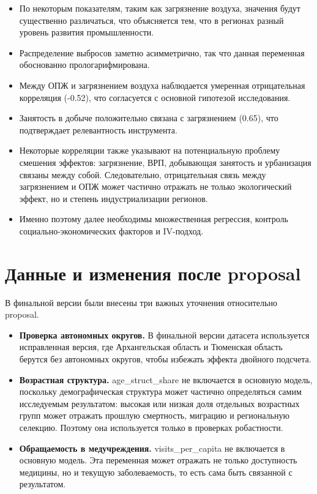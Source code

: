 \documentclass[11pt,a4paper]{article}
\begin{document}
\begin{itemize}
\item По некоторым показателям, таким как загрязнение воздуха, значения будут существенно различаться, что объясняется тем, что в регионах разный уровень развития промышленности.
\item Распределение выбросов заметно асимметрично, так что данная переменная обоснованно прологарифмирована.
\item Между ОПЖ и загрязнением воздуха наблюдается умеренная отрицательная корреляция (-0.52), что согласуется с основной гипотезой исследования.
\item Занятость в добыче положительно связана с загрязнением (0.65), что подтверждает релевантность инструмента.
\item Некоторые корреляции также указывают на потенциальную проблему смешения эффектов: загрязнение, ВРП, добывающая занятость и урбанизация связаны между собой. Следовательно, отрицательная связь между загрязнением и ОПЖ может частично отражать не только экологический эффект, но и степень индустриализации регионов.
\item Именно поэтому далее необходимы множественная регрессия, контроль социально-экономических факторов и IV-подход.
\end{itemize}
\section*{Данные и изменения после proposal}
В финальной версии были внесены три важных уточнения относительно proposal.

\begin{itemize}
\item \textbf{Проверка автономных округов.} В финальной версии датасета используется исправленная версия, где Архангельская область и Тюменская область берутся без автономных округов, чтобы избежать эффекта двойного подсчета.
\item \textbf{Возрастная структура.} age\_struct\_share не включается в основную модель, поскольку демографическая структура может частично определяться самим исследуемым результатом: высокая или низкая доля отдельных возрастных групп может отражать прошлую смертность, миграцию и региональную селекцию. Поэтому она используется только в проверках робастности.
\item \textbf{Обращаемость в медучреждения.} visits\_per\_capita не включается в основную модель. Эта переменная может отражать не только доступность медицины, но и текущую заболеваемость, то есть сама быть связанной с результатом.
\end{itemize}
\end{document}
